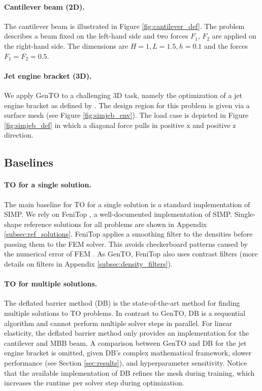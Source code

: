 \paragraph{Cantilever beam (2D).}
The cantilever beam is illustrated in Figure \ref{fig:cantilever_def}. The problem describes a beam fixed on the left-hand side and two forces $F_1$, $F_2$ are applied on the right-hand side. \newline
The dimensions are $H=1, L=1.5, h=0.1$ and the forces $ F_1 = F_2 = 0.5$.


\paragraph{Jet engine bracket (3D).}
We apply GenTO to a challenging 3D task, namely the optimization of a jet engine bracket as defined by \citet{jeb}.
The design region for this problem is given via a surface mesh (see Figure \ref{fig:simjeb_env}).
The load case is depicted in Figure \ref{fig:simjeb_def} in which a diagonal force pulls in positive x and positive z direction.




\subsection{Baselines}

\paragraph{TO for a single solution.}
The main baseline for TO for a single solution is a standard implementation of SIMP.
We rely on FeniTop \citep{fenitop}, a well-documented implementation of SIMP. Single-shape reference solutions for all problems are shown in Appendix \ref{subsec:ref_solutions}. \newline
FeniTop applies a smoothing filter to the densities before passing them to the FEM solver. This avoids checkerboard patterns caused by the numerical error of FEM \citep{sigmund1998numerical}. 
As GenTO, FeniTop also uses contrast filters (more details on filters in Appendix \ref{subsec:density_filters}).


\paragraph{TO for multiple solutions.}
The deflated barrier method (DB) \citep{multi_TO_Papadopoulos_2021} is the state-of-the-art method for finding multiple solutions to TO problems.
In contrast to GenTO, DB is a sequential algorithm and cannot perform multiple solver steps in parallel.
For linear elasticity, the deflated barrier method only provides an implementation for the cantilever and MBB beam.
A comparison between GenTO and DB for the jet engine bracket is omitted, given DB's complex mathematical framework, slower performance (see Section \ref{sec:results}), and hyperparameter sensitivity.
Notice that the available implementation of DB refines the mesh during training, which increases the runtime per solver step during optimization.


